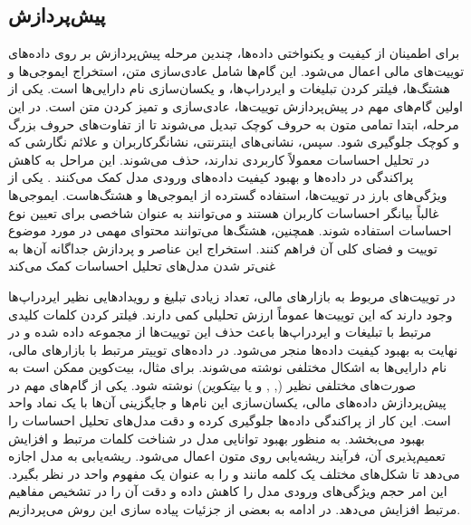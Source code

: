\subsection{پیش‌پردازش}
برای اطمینان از کیفیت و یکنواختی داده‌ها، چندین مرحله پیش‌پردازش بر روی داده‌های توییت‌های مالی اعمال می‌شود. این گام‌ها شامل عادی‌سازی متن، استخراج ایموجی‌ها و هشتگ‌ها، فیلتر کردن تبلیغات و ایردراپ‌ها، و یکسان‌سازی نام دارایی‌ها است. یکی از اولین گام‌های مهم در پیش‌پردازش توییت‌ها، عادی‌سازی و تمیز کردن متن است. در این مرحله، ابتدا تمامی متون به حروف کوچک تبدیل می‌شوند تا از تفاوت‌های حروف بزرگ و کوچک جلوگیری شود. سپس، نشانی‌های اینترنتی، نشانگرکاربران و علائم نگارشی که در تحلیل احساسات معمولاً کاربردی ندارند، حذف می‌شوند. این مراحل به کاهش پراکندگی در داده‌ها و بهبود کیفیت داده‌های ورودی مدل کمک می‌کنند \cite{twitter_pak_2010}. یکی از ویژگی‌های بارز در توییت‌ها، استفاده گسترده از ایموجی‌ها و هشتگ‌هاست. ایموجی‌ها غالباً بیانگر احساسات کاربران هستند و می‌توانند به عنوان شاخصی برای تعیین نوع احساسات استفاده شوند. همچنین، هشتگ‌ها می‌توانند محتوای مهمی در مورد موضوع توییت و فضای کلی آن فراهم کنند. استخراج این عناصر و پردازش جداگانه آن‌ها به غنی‌تر شدن مدل‌های تحلیل احساسات کمک می‌کند \cite{emojipowered_chen_2018}

در توییت‌های مربوط به بازارهای مالی، تعداد زیادی تبلیغ و رویدادهایی نظیر ایردراپ‌ها وجود دارند که این توییت‌ها عموماً ارزش تحلیلی کمی دارند. فیلتر کردن کلمات کلیدی مرتبط با تبلیغات و ایردراپ‌ها باعث حذف این توییت‌ها از مجموعه داده شده و در نهایت به بهبود کیفیت داده‌ها منجر می‌شود. در داده‌های توییتر مرتبط با بازارهای مالی، نام دارایی‌ها به اشکال مختلفی نوشته می‌شوند. برای مثال، بیت‌کوین ممکن است به صورت‌های مختلفی نظیر (\textit{}, \textit{}, و یا \textit{بیتکوین}) نوشته شود. یکی از گام‌های مهم در پیش‌پردازش داده‌های مالی، یکسان‌سازی این نام‌ها و جایگزینی آن‌ها با یک نماد واحد است. این کار از پراکندگی داده‌ها جلوگیری کرده و دقت مدل‌های تحلیل احساسات را بهبود می‌بخشد. به منظور بهبود توانایی مدل در شناخت کلمات مرتبط و افزایش تعمیم‌پذیری آن، فرآیند ریشه‌یابی روی متون اعمال می‌شود. ریشه‌یابی به مدل اجازه می‌دهد تا شکل‌های مختلف یک کلمه مانند \textit{} و  \textit{} را به عنوان یک مفهوم واحد در نظر بگیرد. این امر حجم ویژگی‌های ورودی مدل را کاهش داده و دقت آن را در تشخیص مفاهیم مرتبط افزایش می‌دهد. در ادامه به بعضی از جزئیات پیاده سازی این روش می‌پردازیم.


